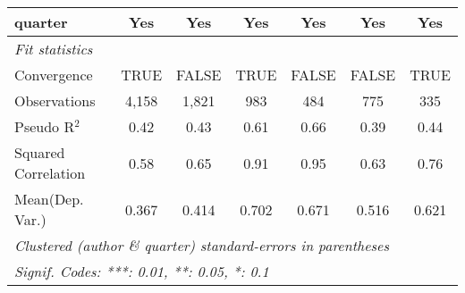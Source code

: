 \begin{tabular}{lcccccc}
   quarter                                                    & Yes          & Yes           & Yes           & Yes         & Yes          & Yes\\  
   \midrule
   \emph{Fit statistics}\\
   Convergence                                                &TRUE          & FALSE         & TRUE          & FALSE       & FALSE        & TRUE\\  
   Observations                                               & 4,158        & 1,821         & 983           & 484         & 775          & 335\\  
   Pseudo R$^2$                                               & 0.42         & 0.43          & 0.61          & 0.66        & 0.39         & 0.44\\  
   Squared Correlation                                        & 0.58         & 0.65          & 0.91          & 0.95        & 0.63         & 0.76\\  
Mean(Dep. Var.) & 0.367 & 0.414 & 0.702 & 0.671 & 0.516 & 0.621 \\
   \midrule \midrule
   \multicolumn{7}{l}{\emph{Clustered (author \& quarter) standard-errors in parentheses}}\\
   \multicolumn{7}{l}{\emph{Signif. Codes: ***: 0.01, **: 0.05, *: 0.1}}\\
\end{tabular}
\par\endgroup
